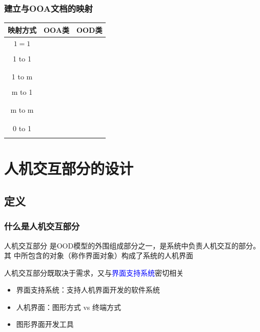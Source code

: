 \documentclass[compress]{beamer}
\begin{document}
\begin{frame}
  \frametitle{建立与OOA文档的映射}
  \footnotesize
  \renewcommand{\arraystretch}{0.8}
  \begin{tabular}{|c|p{3cm}|p{3cm}|}\hline
    \rule[-3mm]{0mm}{8mm} \textbf{映射方式} & \textbf{OOA类} &
    \textbf{OOD类} \\ \hline
    $1 = 1$ & & \\ \cline{2-3}
    & & \\ \cline{2-3} \hline
    1 to 1 & & \\ \cline{2-3}
    & & \\ \cline{2-3}
    & & \\ \cline{2-3} \hline
    1 to m & & \\ \cline{2-3}
    & & \\ \cline{2-3} \hline
    m to 1 & & \\ \cline{2-3}
    & & \\ \cline{2-3}
    & & \\ \cline{2-3} \hline
    m to m & & \\ \cline{2-3}
    & & \\ \cline{2-3}
    & & \\ \cline{2-3} \hline
    0 to 1 & & \\ \cline{2-3}
    & & \\ \cline{2-3} \hline
  \end{tabular}
\end{frame}

\section{人机交互部分的设计}

\subsection{定义}
\begin{frame}
\frametitle{什么是人机交互部分}
\begin{block}{人机交互部分}
是OOD模型的外围组成部分之一，是系统中负责人机交互的部分。其
中所包含的对象（称作界面对象）构成了系统的人机界面
\end{block}

人机交互部分既取决于需求，又与\textcolor{blue}{界面支持系统}密切相关 \\
\begin{itemize}
  \item 界面支持系统：支持人机界面开发的软件系统 
  \item 人机界面：图形方式 vs 终端方式
  \item 图形界面开发工具
\end{itemize}
\end{frame}
\end{document}
